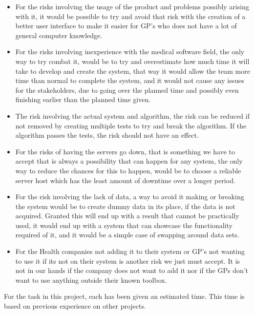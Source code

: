 \begin{itemize}
	\item For the risks involving the usage of the product and problems possibly arising with it, it would be possible to try and avoid that risk with the creation of a better user interface to make it easier for GP’s who does not have a lot of general computer knowledge. 
	\item For the risks involving inexperience with the medical software field, the only way to try combat it, would be to try and overestimate how much time it will take to develop and create the system, that way it would allow the team more time than normal to complete the system, and it would not cause any issues for the stakeholders, due to going over the planned time and possibly even finishing earlier than the planned time given.
	\item The risk involving the actual system and algorithm, the risk can be reduced if not removed by creating multiple tests to try and break the algorithm. If the algorithm passes the tests, the risk should not have an effect.
	\item For the risks of having the servers go down, that is something we have to accept that is always a possibility that can happen for any system, the only way to reduce the chances for this to happen, would be to choose a reliable server host which has the least amount of downtime over a longer period.
	\item For the risk involving the lack of data, a way to avoid it making or breaking the system would be to create dummy data in its place, if the data is not acquired. Granted this will end up with a result that cannot be practically used, it would end up with a system that can showcase the functionality required of it, and it would be a simple case of swapping around data sets.
	\item For the Health companies not adding it to their system or GP’s not wanting to use it if its not on their system is another risk we just must accept. It is not in our hands if the company does not want to add it nor if the GPs don’t want to use anything outside their known toolbox.
\end{itemize}
\pagebreak
For the task in this project, each has been given an estimated time. This time is based on previous experience on other projects.

